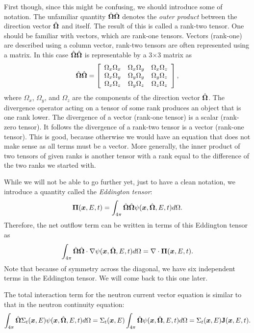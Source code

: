 First though, since this might be confusing, we should introduce some of notation. The unfamiliar quantity $\hat{\mathbf{\Omega}} \hat{\mathbf{\Omega}}$ denotes the \emph{outer product} between the direction vector $\hat{\mathbf{\Omega}}$ and itself. The result of this is called a rank-two tensor. One should be familiar with vectors, which are rank-one tensors. Vectors (rank-one) are described using a column vector, rank-two tensors are often represented using a matrix. In this case $\hat{\mathbf{\Omega}} \hat{\mathbf{\Omega}}$ is representable by a 3$\times$3 matrix as
\begin{align}
  \hat{\mathbf{\Omega}} \hat{\mathbf{\Omega}} = \left[ \begin{array}{c c c}
  	\Omega_x \Omega_x 	& \Omega_x \Omega_y 	& \Omega_x \Omega_z 	\\
  	\Omega_x \Omega_y 	& \Omega_y \Omega_y 	& \Omega_y \Omega_z 	\\
  	\Omega_x \Omega_z 	& \Omega_y \Omega_z 	& \Omega_z \Omega_z 	\\ \end{array} \right] ,
\end{align}
where $\Omega_x$, $\Omega_y$, and $\Omega_z$ are the components of the direction vector $\hat{\mathbf{\Omega}}$. The divergence operator acting on a tensor of some rank produces an object that is one rank lower. The divergence of a vector (rank-one tensor) is a scalar (rank-zero tensor). It follows the divergence of a rank-two tensor is a vector (rank-one tensor). This is good, because otherwise we would have an equation that does not make sense as all terms must be a vector. More generally, the inner product of two tensors of given ranks is another tensor with a rank equal to the difference of the two ranks we started with.

While we will not be able to go further yet, just to have a clean notation, we introduce a quantity called the \emph{Eddington tensor}:
\begin{align}
  \boldsymbol\Pi(\bm{x},E,t) =  \int_{4\pi} \hat{\mathbf{\Omega}} \hat{\mathbf{\Omega}} \psi(\bm{x},\hat{\mathbf{\Omega}},E,t) d\Omega .
\end{align}
Therefore, the net outflow term can be written in terms of this Eddington tensor as
\begin{align}
  \int_{4\pi} \hat{\mathbf{\Omega}} \hat{\mathbf{\Omega}} \cdot \nabla \psi(\bm{x},\hat{\mathbf{\Omega}},E,t) d\Omega = \nabla \cdot \boldsymbol\Pi(\bm{x},E,t) . \nonumber
\end{align}
Note that because of symmetry across the diagonal, we have six independent terms in the Eddington tensor. We will come back to this one later.

The total interaction term for the neutron current vector equation is similar to that in the neutron continuity equation:
\begin{align}
  \int_{4\pi} \hat{\mathbf{\Omega}} \Sigma_t(\bm{x},E) \psi(\bm{x},\hat{\mathbf{\Omega}},E,t) d\Omega = \Sigma_t(\bm{x},E)  \int_{4\pi} \hat{\mathbf{\Omega}} \psi(\bm{x},\hat{\mathbf{\Omega}},E,t) d\Omega = \Sigma_t(\bm{x},E) \mathbf{J}(\bm{x},E,t) . \nonumber
\end{align}

